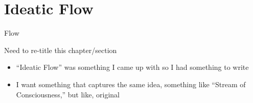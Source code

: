 \documentclass[./butidigress.tex]{subfiles}
\begin{document}
\chapter{Ideatic Flow}
\newpage

\begin{somenotes}{Flow}
    \item Need to re-title this chapter/section\lips
    \begin{itemize}
        \item \enquote{Ideatic Flow} was something I came up with so I had something to write
        \item I want something that captures the same idea, something like \enquote{Stream of Consciousness,} but like, original
    \end{itemize}
\end{somenotes}
\end{document}
